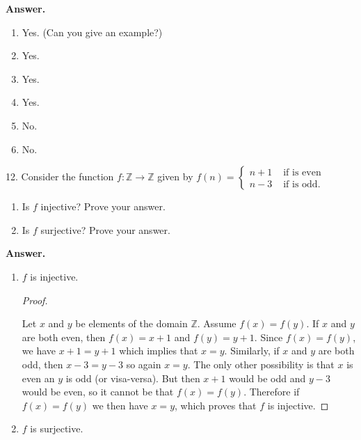 \documentclass[10pt,]{book}
\theoremstyle{plain}
\theoremstyle{definition}
\theoremstyle{definition}
\theoremstyle{definition}
\numberwithin{equation}{section}
\def\Z{\mathbb Z}
\newcommand{\amp}{ & }
\begin{document}
\begin{exerciselist}
\par\smallskip
\par\smallskip
\noindent\textbf{Answer.}\hypertarget{answer-27}{}\quad
\leavevmode%
\begin{enumerate}[label=(\alph*)]
\item\hypertarget{li-189}{}
Yes. (Can you give an example?)
%
\item\hypertarget{li-190}{}
Yes.
%
\item\hypertarget{li-191}{}
Yes.
%
\item\hypertarget{li-192}{}
Yes.
%
\item\hypertarget{li-193}{}
No.
%
\item\hypertarget{li-194}{}
No.
%
\end{enumerate}
\item[12.]\hypertarget{exercise-28}{}
Consider the function \(f:\Z \to \Z\) given by \(f(n) = \begin{cases}n+1 \amp  \mbox{ if  is even} \\
                                                                 n-3 \amp  \mbox{ if  is odd} .
\end{cases}\)
%
\leavevmode%
\begin{enumerate}[label=(\alph*)]
\item\hypertarget{li-195}{}
Is \(f\) injective?  Prove your answer.
%
\item\hypertarget{li-196}{}
Is \(f\) surjective?  Prove your answer.
%
\end{enumerate}
\par\smallskip
\par\smallskip
\noindent\textbf{Answer.}\hypertarget{answer-28}{}\quad
\leavevmode%
\begin{enumerate}[label=(\alph*)]
\item\hypertarget{li-197}{}\(f\) is injective.

\begin{proof}\hypertarget{proof-1}{}

Let \(x\) and \(y\) be elements of the domain \(\Z\). Assume \(f(x) = f(y)\). If \(x\) and \(y\) are both even, then \(f(x) = x+1\) and \(f(y) = y+1\). Since \(f(x) = f(y)\), we have \(x + 1 = y + 1\) which implies that \(x = y\). Similarly, if \(x\) and \(y\) are both odd, then \(x - 3 = y-3\) so again \(x = y\). The only other possibility is that \(x\) is even an \(y\) is odd (or visa-versa). But then \(x + 1\) would be odd and \(y - 3\) would be even, so it cannot be that \(f(x) = f(y)\). Therefore if \(f(x) = f(y)\) we then have \(x = y\), which proves that \(f\) is injective.
%
\end{proof}
\item\hypertarget{li-198}{}\(f\) is surjective.


\end{enumerate}
\end{exerciselist}
\end{document}
